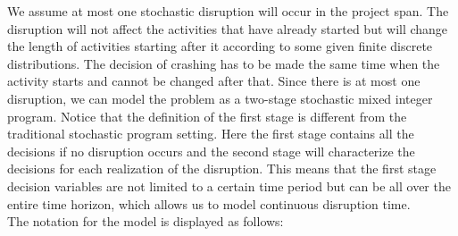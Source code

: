 \documentclass[11pt]{article}
\begin{document}
	\newline
	We assume at most one stochastic disruption will occur in the project span. The disruption will not affect the activities that have already started but will change the length of activities starting after it according to some given finite discrete distributions. The decision of crashing has to be made the same time when the activity starts and cannot be changed after that. Since there is at most one disruption, we can model the problem as a two-stage stochastic mixed integer program. Notice that the definition of the first stage is different from the traditional stochastic program setting. Here the first stage contains all the decisions if no disruption occurs and the second stage will characterize the decisions for each realization of the disruption. This means that the first stage decision variables are not limited to a certain time period but can be all over the entire time horizon, which allows us to model continuous disruption time.\\
	\newline
	The notation for the model is displayed as follows:
\end{document}

